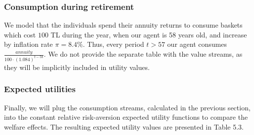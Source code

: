 \documentclass[]{elsarticle}
\begin{document}
\subsubsection{Consumption during retirement}
We model that the individuals spend their annuity returns to consume baskets which cost $100$ TL during the year, when our agent is 58 years old, and increase by inflation rate $\pi = 8.4\%$. Thus, every period $t>57$ our agent consumes $\frac{annuity}{100\cdot\left(1.084\right)^{t-58}}$. We do not provide the separate table with the value streams, as they will be implicitly included in utility values.


\subsubsection{Expected utilities}
Finally, we will plug the consumption streams, calculated in the previous section, into the constant relative risk-aversion expected utility functions to compare the welfare effects. The resulting expected utility values are presented in Table 5.3.
\end{document}
